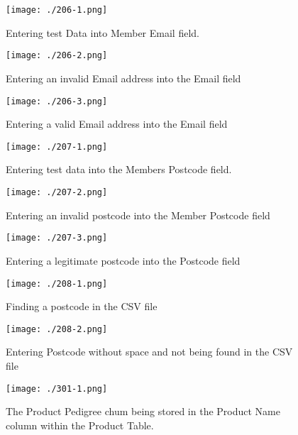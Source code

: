 \begin{figure}[H]
    \texttt{[image: ./206-1.png]}
    \caption{Entering test Data into Member Email field.} \label{fig:206-1}
\end{figure}

\begin{figure}[H]
    \texttt{[image: ./206-2.png]}
    \caption{Entering an invalid Email address into the Email field} \label{fig:206-2}
\end{figure}

\begin{figure}[H]
    \texttt{[image: ./206-3.png]}
    \caption{Entering a valid Email address into the Email field} \label{fig:206-3}
\end{figure}

\begin{figure}[H]
    \texttt{[image: ./207-1.png]}
    \caption{Entering test data into the Members Postcode field.} \label{fig:207-1}
\end{figure}

\begin{figure}[H]
    \texttt{[image: ./207-2.png]}
    \caption{Entering an invalid postcode into the Member Postcode field} \label{fig:207-2}
\end{figure}

\begin{figure}[H]
    \texttt{[image: ./207-3.png]}
    \caption{Entering a legitimate postcode into the Postcode field} \label{fig:207-3}
\end{figure}

\begin{figure}[H]
    \texttt{[image: ./208-1.png]}
    \caption{Finding a postcode in the CSV file} \label{fig:208-1}
\end{figure}

\begin{figure}[H]
    \texttt{[image: ./208-2.png]}
    \caption{Entering Postcode without space and not being found in the CSV file} \label{fig:208-2}
\end{figure}

\begin{figure}[H]
    \texttt{[image: ./301-1.png]}
    \caption{The Product Pedigree chum being stored in the Product Name column within the Product Table.} \label{fig:301-1}
\end{figure}


